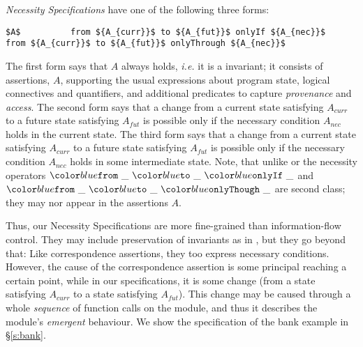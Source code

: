 \textit{Necessity Specifications}   have one of the following three forms:
%
%
%
%
\begin{lstlisting}[mathescape=true, language=chainmail, frame=lines]
       $A$          from ${A_{curr}}$ to ${A_{fut}}$ onlyIf ${A_{nec}}$          from ${A_{curr}}$ to ${A_{fut}}$ onlyThrough ${A_{nec}}$
\end{lstlisting}
%
The first form says that $A$ always holds, \textit{i.e.} it is a invariant; 
it consists of assertions,  $A$, supporting the usual expressions about program state,
  logical connectives and quantifiers, 
 and additional predicates
 to capture \textit{provenance} and \textit{access}.
The second form says that  a change from a current state satisfying $A_{curr}$ to a future
state satisfying $A_{fut}$ %
is possible only if the necessary condition
$A_{nec}$ holds in the current state.
%
The third form says that a change from a current state satisfying $A_{curr}$ to a future
state satisfying $A_{fut}$  is possible only if the necessary condition
$A_{nec}$ holds in some intermediate state.
 Note, that unlike \citeauthor{VerX} or \citeauthor{FASE}
 the necessity operators $\onlyIf {\_} {\_} {\_}$  and $\onlyThrough {\_} {\_} {\_}$
 are second class; they may nor appear in the assertions $A$.

Thus, our Necessity Specifications are more fine-grained than information-flow control.
They may include preservation
of invariants as in \cite{ddd}, but they go beyond that:   
Like correspondence assertions, they too express necessary conditions.
However, the cause of the correspondence assertion is some principal reaching
a certain point, while in our specifications, it is some change (from a state
satisfying ${A_{curr}}$ to a state satisfying ${A_{fut}}$).
This change may be caused through  a whole \emph{sequence} of  function 
calls on the module, and thus it describes the module's \emph{emergent}
behaviour. 
We show the specification of the bank example in  \S\ref{s:bank}.


